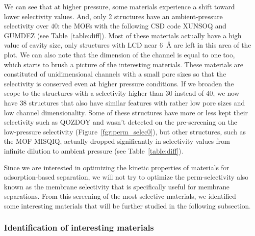 \documentclass[main]{subfiles}
\begin{document}
We can see that at higher pressure, some materials experience a shift toward lower selectivity values. And, only 2 structures have an ambient-pressure selectivity over $40$: the MOFs with the following CSD code XUNSOQ\autocite{Abrahams_2014} and GUMDEZ\cite{Yin_2014}  (see Table~\ref{table:diff}). Most of these materials actually have a high value of cavity size, only structures with LCD near \SI{6}{\angstrom} are left in this area of the plot. We can also note that the dimension of the channel is equal to one too, which starts to brush a picture of the interesting materials. These materials are constituted of unidimensional channels with a small pore sizes so that the selectivity is conserved even at higher pressure conditions. If we broaden the scope to the structures with a selectivity higher than $30$ instead of $40$, we now have 38 structures that also have similar features with rather low pore sizes and low channel dimensionality. Some of these structures have more or less kept their selectivity such as QOZDOY\cite{Zhang_2001} and wasn't detected on the pre-screening on the low-pressure selectivity (Figure~\ref{fgr:perm_selec0}), but other structures, such as the MOF MISQIQ\autocite{Tong_2013}, actually dropped significantly in selectivity values from infinite dilution to ambient pressure (see Table~\ref{table:diff}). 

Since we are interested in optimizing the kinetic properties of materials for adsorption-based separation, we will not try to optimize the perm-selectivity also known as the membrane selectivity that is specifically useful for membrane separations. From this screening of the most selective materials, we identified some interesting materials that will be further studied in the following subsection. 


\subsubsection{Identification of interesting materials}


\end{document}
